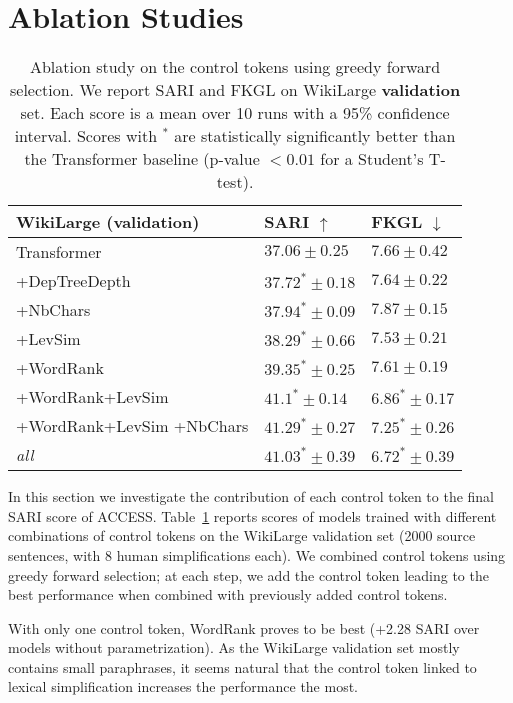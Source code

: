 \documentclass[10pt, a4paper]{article}
\begin{document}
\section{Ablation Studies}
\begin{table}
\small
\begin{tabular}{p{}ll}
\toprule
WikiLarge \textbf{(validation)} & SARI $\uparrow$           & FKGL $\downarrow$        \\
\midrule
    
Transformer & $37.06 \pm 0.25$ & $7.66 \pm 0.42$ \\
\midrule
+DepTreeDepth & $37.72^{*} \pm 0.18$ & $7.64 \pm 0.22$ \\
+NbChars & $37.94^{*} \pm 0.09$ & $7.87 \pm 0.15$ \\
+LevSim & $38.29^{*}  \pm 0.66$ & $7.53 \pm 0.21$ \\
+WordRank & $39.35^{*} \pm 0.25$ & $7.61 \pm 0.19$ \\
\midrule
+WordRank+LevSim & $41.1^{*} \pm 0.14$ & $6.86^{*} \pm 0.17$ \\
\midrule
+WordRank+LevSim +NbChars & $\mathbf{41.29^{*}} \pm 0.27$ & $7.25^{*} \pm 0.26$ \\
\midrule
\textit{all} & $41.03^{*} \pm 0.39$ & $\mathbf{6.72^{*}} \pm 0.39$ \\

\bottomrule
\end{tabular}
\caption{Ablation study on the control tokens using greedy forward selection. We report SARI and FKGL on WikiLarge \textbf{validation} set. Each score is a mean over 10 runs with a 95\% confidence interval. Scores with $^{*}$ are statistically significantly better than the Transformer baseline (p-value $< 0.01$ for a Student's T-test).} \label{ablation}
\end{table}

In this section we investigate the contribution of each control token to the final SARI score of \textsc{ACCESS}.
Table~\ref{ablation} reports scores of models trained with different combinations of control tokens on the WikiLarge validation set (2000 source sentences, with 8 human simplifications each). We combined control tokens using greedy forward selection; at each step, we add the control token leading to the best performance when combined with previously added control tokens.

With only one control token, WordRank proves to be best (+2.28 SARI over models without parametrization).
As the WikiLarge validation set mostly contains small paraphrases, it seems natural that the control token linked to lexical simplification increases the performance the most.
\end{document}
